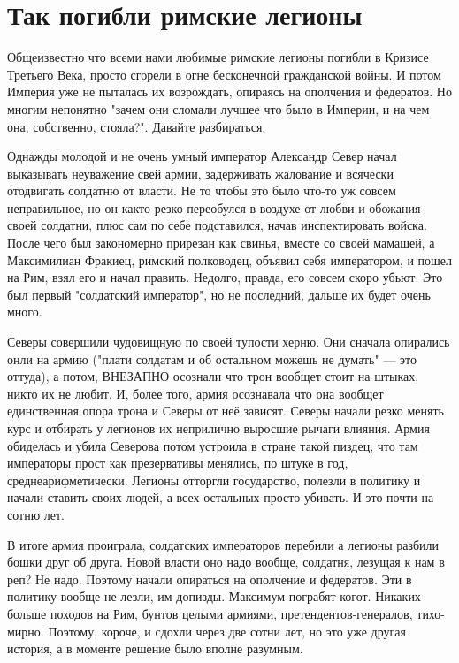 \chapter{Так погибли римские легионы}

Общеизвестно что всеми нами любимые римские легионы погибли в Кризисе Третьего Века, просто сгорели в огне бесконечной гражданской войны. И потом Империя уже не пыталась их возрождать, опираясь на ополчения и федератов. Но многим непонятно "зачем они сломали лучшее что было в Империи, и на чем она, собственно, стояла?". Давайте разбираться.


Однажды молодой и не очень умный император Александр Север начал выказывать неуважение свей армии, задерживать жалование и всячески отодвигать солдатню от власти. Не то чтобы это было что-то уж совсем неправильное, но он както резко переобулся в воздухе от любви и обожания своей солдатни, плюс сам по себе подставился, начав инспектировать войска. После чего был закономерно прирезан как свинья, вместе со своей мамашей, а Максимилиан Фракиец, римский полководец, объявил себя императором, и пошел на Рим, взял его и начал править. Недолго, правда, его совсем скоро убьют. Это был первый "солдатский император", но не последний, дальше их будет очень много.


Северы совершили чудовищную по своей тупости херню. Они сначала опирались онли на армию ("плати солдатам и об остальном можешь не думать" — это оттуда), а потом, ВНЕЗАПНО осознали что трон вообщет стоит на штыках, никто их не любит. И, более того, армия осознавала что она вообщет единственная опора трона и Северы от неё зависят. Северы начали резко менять курс и отбирать у легионов их неприлично выросшие рычаги влияния. Армия обиделась и убила Северова потом устроила в стране такой пиздец, что там императоры прост как презервативы менялись, по штуке в год, среднеарифметически. Легионы отторгли государство, полезли в политику и начали ставить своих людей, а всех остальных просто убивать. И это почти на сотню лет.


В итоге армия проиграла, солдатских императоров перебили а легионы разбили бошки друг об друга. Новой власти оно надо вообще, солдатня, лезущая к нам в реп? Не надо. Поэтому начали опираться на ополчение и федератов. Эти в политику вообще не лезли, им допизды. Максимум пограбят когот. Никаких больше походов на Рим, бунтов целыми армиями, претендентов-генералов, тихо-мирно. Поэтому, короче, и сдохли через две сотни лет, но это уже другая история, а в моменте решение было вполне разумным. 

